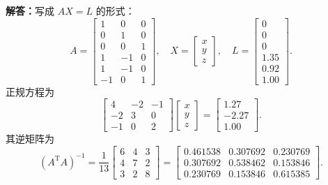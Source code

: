 \documentclass[UTF8,zihao=-4]{ctexart}
\newcommand{\jieda}{\noindent\textbf{解答：}}
\begin{document}
{\jieda 写成 $AX=L$ 的形式：
\begin{equation*}
    A=\begin{bmatrix}
        1&0&0\\
        0&1&0\\
        0&0&1\\
        1&-1&0\\
        1&-1&0\\
        -1&0&1
    \end{bmatrix},\quad
    X=\begin{bmatrix}x\\y\\z\end{bmatrix},\quad
    L=\begin{bmatrix}0\\0\\0\\1.35\\0.92\\1.00\end{bmatrix}.
\end{equation*}
正规方程为
\begin{equation*}
    \begin{bmatrix}
        4&-2&-1\\
        -2&3&0\\
        -1&0&2
    \end{bmatrix}
    \begin{bmatrix}x\\y\\z\end{bmatrix}
    =
    \begin{bmatrix}1.27\\-2.27\\1.00\end{bmatrix}.
\end{equation*}
其逆矩阵为
\begin{equation*}
    (A^{\mathrm T}A)^{-1}=\frac{1}{13}
    \begin{bmatrix}
        6&4&3\\
        4&7&2\\
        3&2&8
    \end{bmatrix}
    =
    \begin{bmatrix}
        0.461538&0.307692&0.230769\\
        0.307692&0.538462&0.153846\\
        0.230769&0.153846&0.615385
    \end{bmatrix}.
\end{equation*}
}
\end{document}
